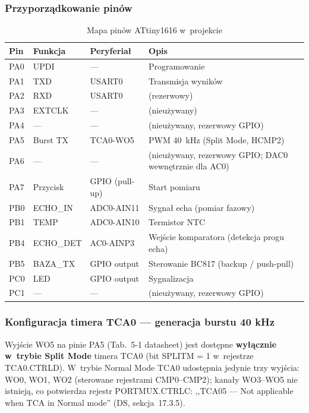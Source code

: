\documentclass[a4paper,11pt]{article}
\begin{document}
\subsubsection{Przyporządkowanie pinów}

\begin{table}[H]
    \centering
    \caption{Mapa pinów ATtiny1616 w~projekcie}
    \label{tab:pinout}
    \begin{tabular}{llll}
        \toprule
        \textbf{Pin} & \textbf{Funkcja} & \textbf{Peryferiał} & \textbf{Opis} \\
        \midrule
        PA0 & UPDI & --- & Programowanie \\
        PA1 & TXD & USART0 & Transmisja wyników \\
        PA2 & RXD & USART0 & (rezerwowy) \\
        PA3 & EXTCLK & --- & (nieużywany) \\
        PA4 & --- & --- & (nieużywany, rezerwowy GPIO) \\
        PA5 & Burst TX & TCA0-WO5 & PWM \SI{40}{\kilo\hertz} (Split Mode, HCMP2) \\
        PA6 & --- & --- & (nieużywany, rezerwowy GPIO; DAC0 wewnętrznie dla AC0) \\
        PA7 & Przycisk & GPIO (pull-up) & Start pomiaru \\
        PB0 & ECHO\_IN & ADC0-AIN11 & Sygnał echa (pomiar fazowy) \\
        PB1 & TEMP & ADC0-AIN10 & Termistor NTC \\
        PB4 & ECHO\_DET & AC0-AINP3 & Wejście komparatora (detekcja progu echa) \\
        PB5 & BAZA\_TX & GPIO output & Sterowanie BC817 (backup / push-pull) \\
        PC0 & LED & GPIO output & Sygnalizacja \\
        PC1 & --- & --- & (nieużywany, rezerwowy GPIO) \\
        \bottomrule
    \end{tabular}
\end{table}

\subsubsection{Konfiguracja timera TCA0 --- generacja burstu 40 kHz}

Wyjście WO5 na pinie PA5 (Tab.~5-1 datasheet) jest dostępne \textbf{wyłącznie
w~trybie Split Mode} timera TCA0 (bit SPLITM = 1 w~rejestrze TCA0.CTRLD).
W~trybie Normal Mode TCA0 udostępnia jedynie trzy wyjścia: WO0, WO1, WO2
(sterowane rejestrami CMP0--CMP2); kanały WO3--WO5 nie istnieją, co potwierdza
rejestr PORTMUX.CTRLC: ,,TCA05 --- Not applicable when TCA in Normal mode''
(DS, sekcja~17.3.5).
\end{document}
